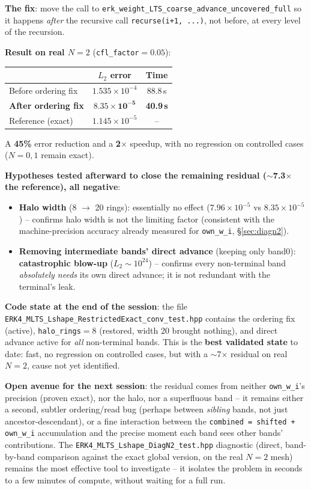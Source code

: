 \documentclass[11pt]{article}
\begin{document}
\textbf{The fix}: move the call to
\texttt{erk\_weight\_LTS\_coarse\_advance\_uncovered\_full} so it
happens \emph{after} the recursive call \texttt{recurse(i+1, ...)},
not before, at every level of the recursion.

\textbf{Result on real $N=2$} (\texttt{cfl\_factor}$=0.05$):
\begin{center}
\begin{tabular}{@{}lcc@{}}
\toprule
& $L_2$ error & Time \\
\midrule
Before ordering fix & $1.535\times10^{-4}$ & 88.8\,s \\
\textbf{After ordering fix} & $\mathbf{8.35\times10^{-5}}$ & \textbf{40.9\,s} \\
Reference (exact) & $1.145\times10^{-5}$ & -- \\
\bottomrule
\end{tabular}
\end{center}
A \textbf{45\%} error reduction and a \textbf{2$\times$} speedup, with
no regression on controlled cases ($N=0,1$ remain exact).

\textbf{Hypotheses tested afterward to close the remaining residual
($\sim$7.3$\times$ the reference), all negative}:
\begin{itemize}
  \item \textbf{Halo width} (8 $\to$ 20 rings): essentially no effect
  ($7.96\times10^{-5}$ vs $8.35\times10^{-5}$) -- confirms halo width
  is not the limiting factor (consistent with the machine-precision
  accuracy already measured for \texttt{own\_w\_i},
  \S\ref{sec:diagn2}).
  \item \textbf{Removing intermediate bands' direct advance} (keeping
  only band0): \textbf{catastrophic blow-up} ($L_2\sim10^{24}$) --
  confirms every non-terminal band \emph{absolutely needs} its own
  direct advance; it is not redundant with the terminal's leak.
\end{itemize}

\textbf{Code state at the end of the session}: the file
\texttt{ERK4\_MLTS\_Lshape\_RestrictedExact\_conv\_test.hpp} contains
the ordering fix (active), \texttt{halo\_rings}$=8$ (restored, width
20 brought nothing), and direct advance active for \emph{all}
non-terminal bands. This is the \textbf{best validated state} to date:
fast, no regression on controlled cases, but with a $\sim$7$\times$
residual on real $N=2$, cause not yet identified.

\textbf{Open avenue for the next session}: the residual comes from
neither \texttt{own\_w\_i}'s precision (proven exact), nor the halo,
nor a superfluous band -- it remains either a second, subtler
ordering/read bug (perhaps between \emph{sibling} bands, not just
ancestor-descendant), or a fine interaction between the
\texttt{combined = shifted + own\_w\_i} accumulation and the precise
moment each band \og sees \fg{} other bands' contributions. The
\texttt{ERK4\_MLTS\_Lshape\_DiagN2\_test.hpp} diagnostic (direct,
band-by-band comparison against the exact global version, on the real
$N=2$ mesh) remains the most effective tool to investigate -- it
isolates the problem in seconds to a few minutes of compute, without
waiting for a full run.
\end{document}
